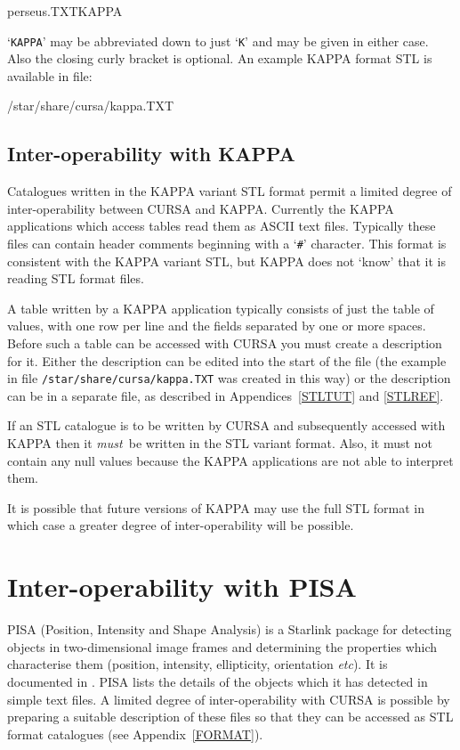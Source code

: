 \documentclass[twoside,11pt]{starlink}
\begin{document}
\begin{terminalv}
perseus.TXT{KAPPA}
\end{terminalv}

`\texttt{KAPPA}' may be abbreviated down to just `\texttt{K}' and may be given
in either case.  Also the closing curly bracket is optional.  An example
KAPPA format STL is available in file:

\begin{terminalv}
/star/share/cursa/kappa.TXT
\end{terminalv}

\subsection{Inter-operability with KAPPA}

Catalogues written in the KAPPA variant STL format permit a limited
degree of inter-operability between CURSA and KAPPA.  Currently the
KAPPA applications which access tables read them as ASCII text files.
Typically these files can contain header comments beginning with a
`\texttt{\#}' character.  This format is consistent with the KAPPA variant
STL, but KAPPA does not `know' that it is reading STL format files.

A table written by a KAPPA application typically consists of just the
table of values, with one row per line and the fields separated by one
or more spaces.  Before such a table can be accessed with CURSA you must
create a description for it.  Either the description can be edited into
the start of the file (the example in file \texttt{/star/share/cursa/kappa.TXT} was created in this way) or the
description can be in a separate file, as described in
Appendices~\ref{STLTUT} and \ref{STLREF}.

If an STL catalogue is to be written by CURSA and subsequently accessed
with KAPPA then it \textit{must}\, be written in the STL variant format.
Also, it must not contain any null values because the KAPPA applications
are not able to interpret them.

It is possible that future versions of KAPPA may use the full STL format
in which case a greater degree of inter-operability will be possible.


\section{\label{PISA}Inter-operability with PISA}

PISA (Position, Intensity and Shape Analysis) is a Starlink package for
detecting objects in two-dimensional image frames and determining
the properties which characterise them (position, intensity, ellipticity,
orientation \emph{etc}\/).  It is documented in
\cite{SUN109}.  PISA lists the details of the
objects which it has detected in simple text files.  A limited degree of
inter-operability with CURSA is possible by preparing a suitable description
of these files so that they can be accessed as STL format catalogues (see
Appendix~\ref{FORMAT}).
\end{document}
